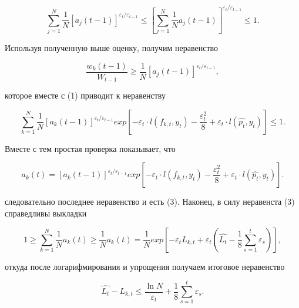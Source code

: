 \documentclass{article}
\begin{document}
\[ 
\sum^N_{j=1} \frac{1}{N} [a_j(t-1)]^{\varepsilon_t / \varepsilon_{t-1}} \le [\sum^N_{j=1} \frac{1}{N} a_j(t-1)]^{\varepsilon_t / \varepsilon_{t-1}} \le 1.
\]

Используя полученную выше оценку, получим неравенство

\[
\frac{w_k(t-1)}{W_{t-1}} \ge \frac{1}{N} [a_j(t-1)]^{\varepsilon_t / \varepsilon_{t-1}},
\]

которое вместе с (1) приводит к неравенству

\[
\sum^N_{k=1} \frac{1}{N} [a_k(t-1)]^{\varepsilon_t / \varepsilon_{t-1}} exp [-\varepsilon_t \cdot l(f_{k,t}, y_t) - 
\frac{\varepsilon^2_t}{8} + \varepsilon_t \cdot l(\hat{p_t}, y_t) ] \le 1.
\]

Вместе с тем простая проверка показывает, что
 
\[
a_k(t) = [a_k(t-1)]^{\varepsilon_t / \varepsilon_{t-1}} exp [-\varepsilon_t \cdot l(f_{k,t}, y_t) - 
\frac{\varepsilon^2_t}{8} + \varepsilon_t \cdot l(\hat{p_t}, y_t) ].
\]

следовательно последнее неравенство и есть (3). Наконец, в силу неравенста (3) справедливы выкладки

\[
1 \ge \sum^N_{k=1} \frac{1}{N} a_k(t) \ge \frac{1}{N} a_k(t) = \frac{1}{N}  exp [-\varepsilon_t L_{k,t} + \varepsilon_t (\hat{L_t} - \frac{1}{8} \sum^t_{s=1} \varepsilon_s )],
\]

откуда после логарифмирования и упрощения получаем итоговое неравенство

\[
\hat{L_t} - L_{k,t} \le \frac{\ln{N}}{\varepsilon_t} + \frac{1}{8} \sum^t_{s=1} \varepsilon_s.
\]
\end{document}

